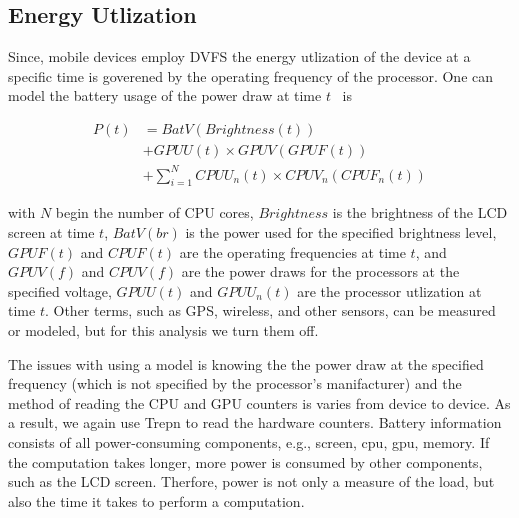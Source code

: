 \subsection{Energy Utlization}

Since, mobile devices employ DVFS
  the energy utlization of the device at a specific time is goverened by
  the operating frequency of the processor.
One can model the battery usage of the power draw at time $t$~\cite{zhang2010accurate, dong2011self} is

\begin{align*}
P(t) &= BatV(Brightness(t)) \\
     &+ GPUU(t) \times GPUV(GPUF(t)) \\
     &+ \sum_{i=1}^{N} CPUU_n(t) \times CPUV_n(CPUF_n(t))
\end{align*}

with $N$ begin the number of CPU cores, $Brightness$ is the brightness of the LCD screen at time $t$, $BatV(br)$ is the power used for the specified brightness level, $GPUF(t)$ and $CPUF(t)$ are the operating frequencies at time $t$, and $GPUV(f)$ and $CPUV(f)$ are the power draws for the processors at the specified voltage, $GPUU(t)$ and $GPUU_n(t)$ are the processor utlization at time $t$.
Other terms, such as GPS, wireless, and other sensors, can be measured or modeled, but for this analysis we turn them off.

The issues with using a model is knowing the the power draw at the specified
  frequency (which is not specified by the processor's manifacturer) and the method of reading
  the CPU and GPU counters is varies from device to device.
As a result, we again use Trepn to read the hardware
  counters.
Battery information consists of all power-consuming components, e.g., screen,
cpu, gpu, memory.
If the computation takes longer, more power is consumed by other components, such as the LCD screen.
Therfore, power is not only a measure of the load, but also the time it takes to perform a computation.

